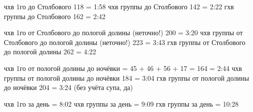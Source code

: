 
чхв 1го до Столбового 118 = 1:58
чхв группы до Столбового 142 = 2:22
гхв группы до Столбового 162 = 2:42

чхв 1го от Столбового до пологой долины (неточно!) 200 = 3:20
чхв группы от Столбового до пологой долины (неточно!) 223 = 3:43
гхв группы от Столбового до пологой долины 262 = 4:22

чхв 1го от пологой долины до ночёвки = 45 + 46 + 56 + 17 = 164 = 2:44
чхв группы от пологой долины до ночёвки 184 = 3:04
гхв группы от пологой долины до ночёвки 204 = 3:24 (без учёта супа, да)

чхв 1го за день = 8:02
чхв группы за день = 9:09
гхв группы за день = 10:28
    \FloatBarrier
